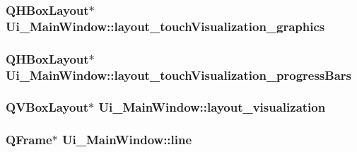 \subsubsection[{\texorpdfstring{layout\+\_\+touch\+Visualization\+\_\+graphics}{layout_touchVisualization_graphics}}]{\setlength{\rightskip}{0pt plus 5cm}Q\+H\+Box\+Layout$\ast$ Ui\+\_\+\+Main\+Window\+::layout\+\_\+touch\+Visualization\+\_\+graphics}\hypertarget{class_ui___main_window_a98bbbada6f684a1f9e1e3c5e5738e464}{}\label{class_ui___main_window_a98bbbada6f684a1f9e1e3c5e5738e464}
\subsubsection[{\texorpdfstring{layout\+\_\+touch\+Visualization\+\_\+progress\+Bars}{layout_touchVisualization_progressBars}}]{\setlength{\rightskip}{0pt plus 5cm}Q\+H\+Box\+Layout$\ast$ Ui\+\_\+\+Main\+Window\+::layout\+\_\+touch\+Visualization\+\_\+progress\+Bars}\hypertarget{class_ui___main_window_aa52a9abae97e4436e08e3eaf7f1fa68d}{}\label{class_ui___main_window_aa52a9abae97e4436e08e3eaf7f1fa68d}
\subsubsection[{\texorpdfstring{layout\+\_\+visualization}{layout_visualization}}]{\setlength{\rightskip}{0pt plus 5cm}Q\+V\+Box\+Layout$\ast$ Ui\+\_\+\+Main\+Window\+::layout\+\_\+visualization}\hypertarget{class_ui___main_window_a10ac06daf3f3143ca8dce61b1c7ce678}{}\label{class_ui___main_window_a10ac06daf3f3143ca8dce61b1c7ce678}
\subsubsection[{\texorpdfstring{line}{line}}]{\setlength{\rightskip}{0pt plus 5cm}Q\+Frame$\ast$ Ui\+\_\+\+Main\+Window\+::line}\hypertarget{class_ui___main_window_a16e802a7ebd4beb9d8aba858565e51b3}{}\label{class_ui___main_window_a16e802a7ebd4beb9d8aba858565e51b3}
